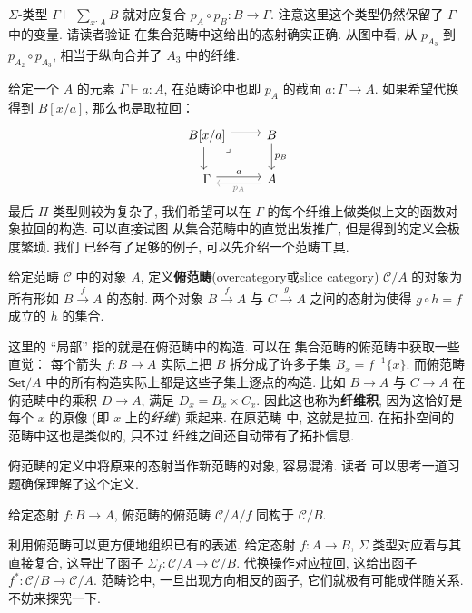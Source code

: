 \(\Sigma\)-类型 \(\Gamma \vdash \sum_{x:A}B\)
就对应复合 \(p_A \circ p_B : B \to \Gamma\).
注意这里这个类型仍然保留了 \(\Gamma\) 中的变量. 请读者验证
在集合范畴中这给出的态射确实正确. 从图中看, 从 \(p_{A_3}\)
到 \(p_{A_2} \circ p_{A_3}\), 相当于纵向合并了
\(A_3\) 中的纤维.

给定一个 \(A\) 的元素
\(\Gamma \vdash a : A\), 在范畴论中也即 \(p_A\) 的截面
\(a : \Gamma \to A\). 如果希望代换得到 \(B[x/a]\),
那么也是取拉回：
\[\begin{tikzcd}
  {B[x/a]} & B \\
  \Gamma & A
  \arrow["a", shift left=1, from=2-1, to=2-2]
  \arrow["{p_A}", shift left=1, color={rgb,255:red,128;green,128;blue,128}, from=2-2, to=2-1]
  \arrow["{p_B}", from=1-2, to=2-2]
  \arrow[shift right=1, from=1-1, to=2-1]
  \arrow[shift left=1, from=1-1, to=1-2]
  \arrow["\lrcorner"{anchor=center, pos=0.125}, draw=none, from=1-1, to=2-2]
\end{tikzcd}\]
最后 \(\Pi\)-类型则较为复杂了, 我们希望可以在 \(\Gamma\)
的每个纤维上做类似上文的函数对象拉回的构造. 可以直接试图
从集合范畴中的直觉出发推广, 但是得到的定义会极度繁琐. 我们
已经有了足够的例子, 可以先介绍一个范畴工具.

\begin{definition}
给定范畴 \(\mathcal C\) 中的对象 \(A\),
定义\textbf{俯范畴}(overcategory或slice category)
\(\mathcal C/A\) 的对象为所有形如
\(B \xrightarrow{f} A\) 的态射. 两个对象
\(B \xrightarrow f A\) 与 \(C \xrightarrow g A\)
之间的态射为使得 \(g \circ h = f\) 成立的 \(h\) 的集合.
\end{definition}
这里的 “局部” 指的就是在俯范畴中的构造. 可以在
集合范畴的俯范畴中获取一些直觉： 每个箭头
\(f : B \to A\) 实际上把 \(B\) 拆分成了许多子集
\(B_x = f^{-1}\{x\}\). 而俯范畴 \(\textsf{Set}/A\)
中的所有构造实际上都是这些子集上逐点的构造. 比如
\(B \to A\) 与 \(C \to A\) 在俯范畴中的乘积
\(D \to A\), 满足 \(D_x = B_x \times C_x\).
因此这也称为\textbf{纤维积}, 因为这恰好是每个 \(x\)
的原像 (即 \(x\) 上的\emph{纤维}) 乘起来. 在原范畴
中, 这就是拉回. 在拓扑空间的范畴中这也是类似的, 只不过
纤维之间还自动带有了拓扑信息.

俯范畴的定义中将原来的态射当作新范畴的对象, 容易混淆. 读者
可以思考一道习题确保理解了这个定义.
\begin{lemma}\label{category:sliceslice}
给定态射 \(f : B \to A\), 俯范畴的俯范畴
\(\mathcal C/A/f\) 同构于 \(\mathcal C/B\).
\end{lemma}

利用俯范畴可以更方便地组织已有的表述. 给定态射
\(f : A \to B\), \(\Sigma\) 类型对应着与其直接复合,
这导出了函子 \(\Sigma_f : \mathcal C/A \to \mathcal C/B\).
代换操作对应拉回, 这给出函子
\(f^* : \mathcal C/B \to \mathcal C/A\).
范畴论中, 一旦出现方向相反的函子, 它们就极有可能成伴随关系.
不妨来探究一下.

